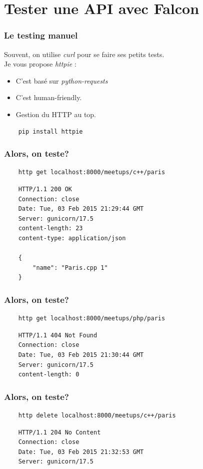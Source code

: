 \documentclass[10pt, compress]{beamer}
\begin{document}
\section{Tester une API avec Falcon}
\begin{frame}[fragile]
	\frametitle{Le testing manuel}
    
	Souvent, on utilise \emph{curl} pour se faire ses petits tests. \pause \\
	Je vous propose \emph{httpie} :
	\pause
	\begin{itemize}[<+->]
		\item C'est basé sur \emph{python-requests}
		\item C'est human-friendly.
		\item Gestion du HTTP au top.
	\end{itemize}
	\pause
    \begin{verbatim}
    pip install httpie
    \end{verbatim}
\end{frame}
\begin{frame}[fragile]
	\frametitle{Alors, on teste?}
    
    \begin{verbatim}
    http get localhost:8000/meetups/c++/paris
    \end{verbatim}
    \pause
    \begin{verbatim}
    HTTP/1.1 200 OK
    Connection: close
    Date: Tue, 03 Feb 2015 21:29:44 GMT
    Server: gunicorn/17.5
    content-length: 23
    content-type: application/json

    {
        "name": "Paris.cpp 1"
    }
    \end{verbatim}
\end{frame}
\begin{frame}[fragile]
	\frametitle{Alors, on teste?}
    
    \begin{verbatim}
    http get localhost:8000/meetups/php/paris
    \end{verbatim}
    \pause
    \begin{verbatim}
    HTTP/1.1 404 Not Found
    Connection: close
    Date: Tue, 03 Feb 2015 21:30:44 GMT
    Server: gunicorn/17.5
    content-length: 0
    \end{verbatim}
\end{frame}
\begin{frame}[fragile]
	\frametitle{Alors, on teste?}
    
    \begin{verbatim}
    http delete localhost:8000/meetups/c++/paris
    \end{verbatim}
    \pause
    \begin{verbatim}
    HTTP/1.1 204 No Content
    Connection: close
    Date: Tue, 03 Feb 2015 21:32:53 GMT
    Server: gunicorn/17.5
    \end{verbatim}
\end{frame}
\end{document}
